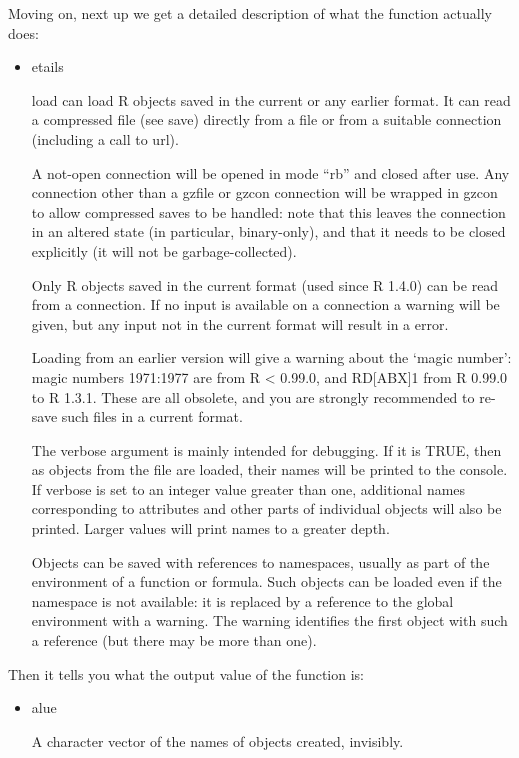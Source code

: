 \documentclass[
]{book}
\newenvironment{rmdnote}
  {\begin{rmdblock}}
  {\end{rmdblock}}
\newenvironment{rmdblock}[1]
  {
  \begin{itemize}
  \renewcommand{\labelitemi}{
    \raisebox{-.7\height}[0pt][0pt]{
      {\setkeys{Gin}{width=3em,keepaspectratio}}
    }
  }
  \setlength{\fboxsep}{1em}
  \item
  }
  {
  \end{itemize}
  }
\begin{document}
Moving on, next up we get a detailed description of what the function actually does:
\begin{rmdnote}
Details

load can load {R} objects saved in the current or any earlier
format. It can read a compressed file (see save)
directly from a file or from a suitable connection (including a call
to url).

A not-open connection will be opened in mode ``rb'' and closed
after use. Any connection other than a gzfile or
gzcon connection will be wrapped in gzcon
to allow compressed saves to be handled: note that this leaves the
connection in an altered state (in particular, binary-only), and that
it needs to be closed explicitly (it will not be garbage-collected).

Only {R} objects saved in the current format (used since {R} 1.4.0)
can be read from a connection. If no input is available on a
connection a warning will be given, but any input not in the current
format will result in a error.

Loading from an earlier version will give a warning about the
`magic number': magic numbers 1971:1977 are from {R} \textless{}
0.99.0, and RD{[}ABX{]}1 from {R} 0.99.0 to {R} 1.3.1. These are all
obsolete, and you are strongly recommended to re-save such files in a
current format.

The verbose argument is mainly intended for debugging. If it
is TRUE, then as objects from the file are loaded, their
names will be printed to the console. If verbose is set to
an integer value greater than one, additional names corresponding to
attributes and other parts of individual objects will also be printed.
Larger values will print names to a greater depth.

Objects can be saved with references to namespaces, usually as part of
the environment of a function or formula. Such objects can be loaded
even if the namespace is not available: it is replaced by a reference
to the global environment with a warning. The warning identifies the
first object with such a reference (but there may be more than one).
\end{rmdnote}

Then it tells you what the output value of the function is:

\begin{rmdnote}
Value

A character vector of the names of objects created, invisibly.
\end{rmdnote}
\end{document}
